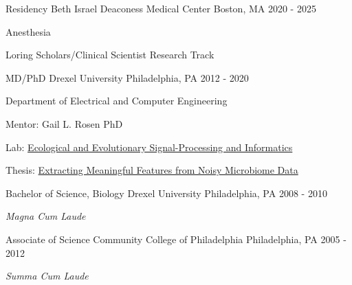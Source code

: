 

\begin{cventries}

  \cventry
    {Residency}
    {Beth Israel Deaconess Medical Center}
    {Boston, MA}
    {2020 - 2025}
    {
    \begin{cvitems}
    \item Anesthesia
    \item Loring Scholars/Clinical Scientist Research Track
    \end{cvitems}
    }
 
    
  \cventry
    {MD/PhD} %
    {Drexel University} %
    {Philadelphia, PA} %
    {2012 - 2020} %
    {
      \begin{cvitems} %
         \item Department of Electrical and Computer Engineering
         \item Mentor: Gail L. Rosen PhD
         \item Lab: \href{http://drexeleesi.com/}{Ecological and Evolutionary Signal-Processing and Informatics}
	 \item Thesis: \href{https://idea.library.drexel.edu/islandora/object/idea\%3A8189}{Extracting Meaningful Features from Noisy Microbiome Data}
      \end{cvitems}
    }
    
  \cventry
    {Bachelor of Science, Biology} %
    {Drexel University} %
    {Philadelphia, PA} %
    {2008 - 2010} %
    {
      \begin{cvitems} %
         \item \textit{Magna Cum Laude}
      \end{cvitems}
    }
    
  \cventry
    {Associate of Science} %
    {Community College of Philadelphia} %
    {Philadelphia, PA} %
    {2005 - 2012} %
    {
      \begin{cvitems} %
         \item \textit{Summa Cum Laude}
      \end{cvitems}
    }

\end{cventries}

